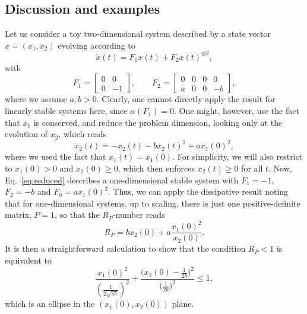 \documentclass[superscriptaddress,onecolumn,nofootinbib,longbibliography,a4paper,accepted=2026-09-29]{quantumarticle}
\theoremstyle{plain}
\theoremstyle{definition}
\numberwithin{thm}{section}
\numberwithin{assumption}{section}
\numberwithin{lemma}{section}
\numberwithin{prop}{section}
\numberwithin{cor}{section}
\numberwithin{definition}{section}
\numberwithin{rmk}{section}
\numberwithin{equation}{section}
\begin{document}

\subsection{Discussion and examples}
\label{sec:cons_discussion}

Let us consider a toy two-dimensional system described by a state vector $x=(x_1,x_2)$ evolving according to
\begin{equation}
    \label{eq:toy1}
    \dot{x}(t) = F_1 x(t) + F_2 x(t)^{\otimes 2},
\end{equation}
with
\begin{equation}
    \label{eq:toy2}
    F_1 = \begin{bmatrix}
        0 & 0\\
        0 & -1
    \end{bmatrix},
    \qquad
    F_2 = \begin{bmatrix}
        0 & 0 & 0 & 0 \\
        a & 0 & 0 & -b
    \end{bmatrix},
\end{equation}
where we assume $a,b >0$. Clearly, one cannot directly apply the result for linearly stable systems here, since $\alpha(F_1)=0$. One might, however, use the fact that $x_1$ is conserved, and reduce the problem dimension, looking only at the evolution of $x_2$, which reads
\begin{equation}
    \label{eq:reduced}
    \dot{x}_2(t) = -x_2(t) -bx_2(t)^2+ a x_1(0)^2,
\end{equation}
where we used the fact that $x_1(t)=x_1(0)$. For simplicity, we will also restrict to $x_1(0) >0$ and $x_2(0)\geq 0$, which then enforces $x_2(t) \geq 0$ for all $t$. Now, Eq.~\eqref{eq:reduced} describes a one-dimensional  stable system with $F_1=-1$, $F_2=-b$ and $F_0=a x_1(0)^2$. Thus, we can apply the dissipative result noting that for one-dimensional systems, up to scaling, there is just one positive-definite matrix, $P=1$, so that the $R_P$-number reads
\begin{equation}
    R_P = b x_2(0) + a \frac{x_1(0)^2}{x_2(0)}.
\end{equation}
It is then a straightforward calculation to show that the condition $R_P<1$ is equivalent to
\begin{equation}
    \label{eq:ellipse}
     \frac{x_1(0)^2}{\left(\frac{1}{2\sqrt{ab}}\right)^2} + \frac{\big(x_2(0) - \frac{1}{2b} \big)^2}{\Big(\frac{1}{2b}\Big)^2} \leq 1,
\end{equation}
which is an ellipse in the $(x_1(0),x_2(0))$ plane.
\end{document}
